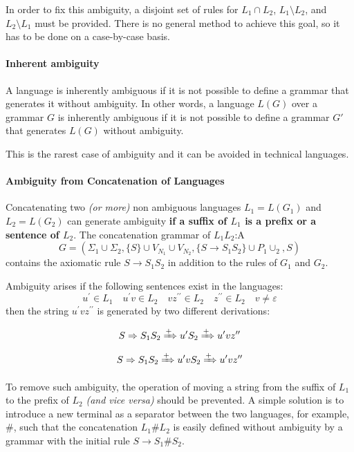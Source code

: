 \documentclass[english]{article}
\begin{document}
In order to fix this ambiguity, a disjoint set of rules for \(L_1 \cap L_2\), \(L_1 \setminus L_2\), and \(L_2 \setminus L_1\) must be provided.
There is no general method to achieve this goal, so it has to be done on a case-by-case basis.

\paragraph{Inherent ambiguity}

A language is inherently ambiguous if it is not possible to define a grammar that generates it without ambiguity.
In other words, a language \(L(G)\) over a grammar \(G\) is inherently ambiguous if it is not possible to define a grammar \(G'\) that generates \(L(G)\) without ambiguity.

This is the rarest case of ambiguity and it can be avoided in technical languages.

\paragraph{Ambiguity from Concatenation of Languages}

Concatenating two \textit{(or more)} non ambiguous languages \(L_1 = L(G_1)\) and \(L_2 = L(G_2)\) can generate ambiguity \textbf{if a suffix of \(L_1\) is a prefix or a sentence of \(L_2\)}.
The concatenation grammar of \(L_1 L_2\):A
\[G = \left(\Sigma_1 \cup \Sigma_2, \{S\} \cup V_{N_1} \cup V_{N_2}, \{S \rightarrow S_1 S_2\} \cup P_1 \cup _2, S\right)\]
contains the axiomatic rule \(S \rightarrow S_1 S_2\) in addition to the rules of \(G_1\) and \(G_2\).

Ambiguity arises if the following sentences exist in the languages:
\[ u^\prime \in L_1 \quad u^\prime v \in L_2 \quad v z^{\prime \prime} \in L_2 \quad z^{\prime \prime} \in L_2 \quad v \neq \varepsilon \]
then the string \(u^\prime v z^{\prime \prime}\) is generated by two different derivations:

\[S \Rightarrow S_1 S_2 \xRightarrow{+} u^\prime S_2 \xRightarrow{+} u^\prime v z^{\prime \prime}\]
\[S \Rightarrow S_1 S_2 \xRightarrow{+} u^\prime v S_2 \xRightarrow{+} u^\prime v z^{\prime \prime}\]

To remove such ambiguity, the operation of moving a string from the suffix of \(L_1\) to the prefix of \(L_2\) \textit{(and vice versa)} should be prevented.
A simple solution is to introduce a new terminal as a separator between the two languages, for example, \(\#\), such that the concatenation \(L_1 \# L_2\) is easily defined without ambiguity by a grammar with the initial rule \(S \rightarrow S_1 \# S_2\).
\end{document}
